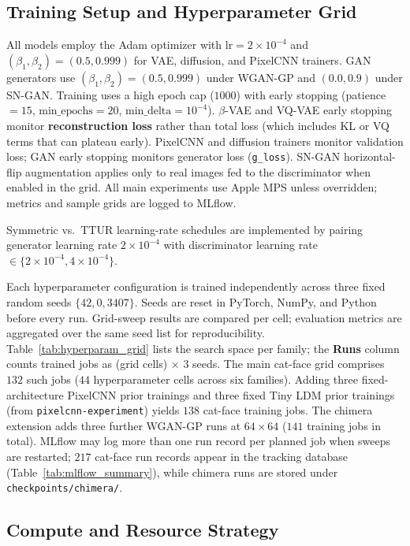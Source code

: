 \documentclass[cameraready]{Interspeech}
\begin{document}
\subsection{Training Setup and Hyperparameter Grid}

All models employ the Adam optimizer \cite{kingma2014adam} with $\text{lr} = 2 \times 10^{-4}$ and $(\beta_1, \beta_2) = (0.5, 0.999)$ for VAE, diffusion, and PixelCNN trainers. GAN generators use $(\beta_1, \beta_2) = (0.5, 0.999)$ under WGAN-GP and $(0.0, 0.9)$ under SN-GAN. Training uses a high epoch cap ($1000$) with early stopping (patience $= 15$, $\text{min\_epochs} = 20$, $\text{min\_delta} = 10^{-4}$). $\beta$-VAE and VQ-VAE early stopping monitor \textbf{reconstruction loss} rather than total loss (which includes KL or VQ terms that can plateau early). PixelCNN and diffusion trainers monitor validation loss; GAN early stopping monitors generator loss (\texttt{g\_loss}). SN-GAN horizontal-flip augmentation applies only to real images fed to the discriminator when enabled in the grid. All main experiments use Apple MPS unless overridden; metrics and sample grids are logged to MLflow.

Symmetric vs.\ TTUR learning-rate schedules \cite{heusel2017gans} are implemented by pairing generator learning rate $2 \times 10^{-4}$ with discriminator learning rate $\in \{2 \times 10^{-4}, 4 \times 10^{-4}\}$.

Each hyperparameter configuration is trained independently across three fixed random seeds $\{42, 0, 3407\}$. Seeds are reset in PyTorch, NumPy, and Python before every run. Grid-sweep results are compared per cell; evaluation metrics are aggregated over the same seed list for reproducibility. Table~\ref{tab:hyperparam_grid} lists the search space per family; the \textbf{Runs} column counts trained jobs as (grid cells) $\times$ 3 seeds. The main cat-face grid comprises $132$ such jobs ($44$ hyperparameter cells across six families). Adding three fixed-architecture PixelCNN prior trainings and three fixed Tiny LDM prior trainings (from \texttt{pixelcnn-experiment}) yields $138$ cat-face training jobs. The chimera extension adds three further WGAN-GP runs at $64 \times 64$ ($141$ training jobs in total). MLflow may log more than one run record per planned job when sweeps are restarted; $217$ cat-face run records appear in the tracking database (Table~\ref{tab:mlflow_summary}), while chimera runs are stored under \texttt{checkpoints/chimera/}.

\subsection{Compute and Resource Strategy}
\end{document}
